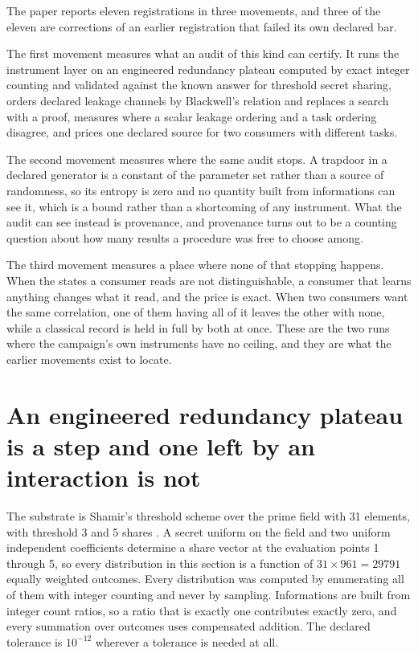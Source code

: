 \documentclass[aps,pre,reprint,nofootinbib]{revtex4-2}
\begin{document}
The paper reports eleven registrations in three movements, and three
of the eleven are corrections of an earlier registration that failed
its own declared bar.

The first movement measures what an audit of this kind can certify.
It runs the instrument layer on an engineered redundancy plateau
computed by exact integer counting and validated against the known
answer for threshold secret sharing, orders declared leakage channels
by Blackwell's relation and replaces a search with a proof, measures
where a scalar leakage ordering and a task ordering disagree, and
prices one declared source for two consumers with different tasks.

The second movement measures where the same audit stops.  A trapdoor
in a declared generator is a constant of the parameter set rather than
a source of randomness, so its entropy is zero and no quantity built
from informations can see it, which is a bound rather than a
shortcoming of any instrument.  What the audit can see instead is
provenance, and provenance turns out to be a counting question about
how many results a procedure was free to choose among.

The third movement measures a place where none of that stopping
happens.  When the states a consumer reads are not distinguishable, a
consumer that learns anything changes what it read, and the price is
exact.  When two consumers want the same correlation, one of them
having all of it leaves the other with none, while a classical record
is held in full by both at once.  These are the two runs where the
campaign's own instruments have no ceiling, and they are what the
earlier movements exist to locate.

\section{An engineered redundancy plateau is a step and one left by an
interaction is not}
\label{sec:cr0}

The substrate is Shamir's threshold scheme over the prime field with
31 elements, with threshold 3 and 5 shares \cite{Shamir1979}.  A
secret uniform on the field and two uniform independent coefficients
determine a share vector at the evaluation points 1 through 5, so
every distribution in this section is a function of $31 \times 961 =
29791$ equally weighted outcomes.  Every distribution was computed by
enumerating all of them with integer counting and never by sampling.
Informations are built from integer count ratios, so a ratio that is
exactly one contributes exactly zero, and every summation over
outcomes uses compensated addition.  The declared tolerance is
$10^{-12}$ wherever a tolerance is needed at all.
\end{document}
